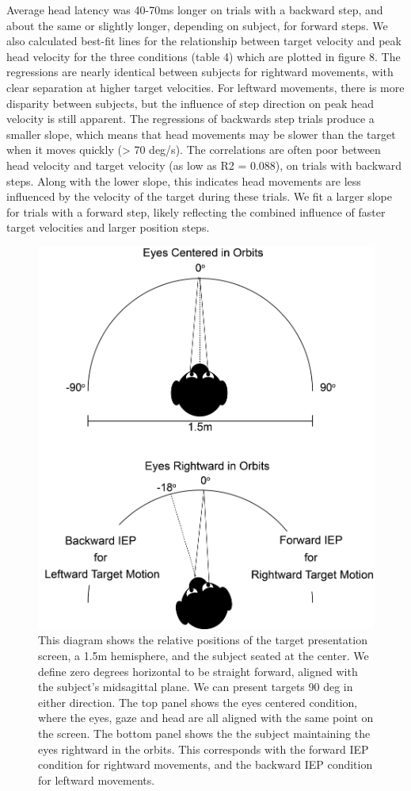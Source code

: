 \documentclass[12pt]{article}
\begin{document}
Average head latency was 40-70ms longer on trials with a backward step, and about the same or slightly longer, depending on subject, for forward steps. We also calculated best-fit lines for the relationship between target velocity and peak head velocity for the three conditions (table 4) which are plotted in figure 8. The regressions are nearly identical between subjects for rightward movements, with clear separation at higher target velocities. For leftward movements, there is more disparity between subjects, but the influence of step direction on peak head velocity is still apparent. The regressions of backwards step trials produce a smaller slope, which means that head movements may be slower than the target when it moves quickly (> 70 deg/s). The correlations are often poor between head velocity and target velocity (as low as R2 = 0.088), on trials with backward steps. Along with the lower slope, this indicates head movements are less influenced by the velocity of the target during these trials. We fit a larger slope for trials with a forward step, likely reflecting the combined influence of faster target velocities and larger position steps.

\begin{figure}[h]
\centering
\includegraphics[width=0.7\linewidth]{./figs/IEPMethodsFigure}
\caption[Diagram of target presentation and initial eye position]{This diagram shows the relative positions of the target presentation screen, a 1.5m hemisphere, and the subject seated at the center. We define zero degrees horizontal to be straight forward, aligned with the subject's midsagittal plane. We can present targets 90 deg in either direction. The top panel shows the eyes centered condition, where the eyes, gaze and head are all aligned with the same point on the screen. The bottom panel shows the the subject maintaining the eyes rightward in the orbits. This corresponds with the forward IEP condition for rightward movements, and the backward IEP condition for leftward movements.}
\label{fig:IEPMethodsFigure}
\end{figure}
\end{document}
